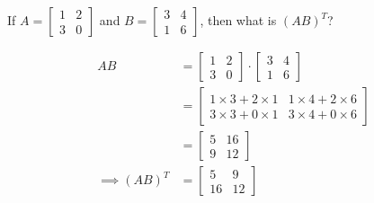

\question[2] If $A = \left[ \begin{array}{cc} 
1 & 2 \\ 
3 & 0
\end{array}\right]$ and 
$B = \left[ \begin{array}{cc}
3 & 4 \\
1 & 6
\end{array} \right]$, then what is $(AB)^{T}$?


\ifprintanswers
\fi 

\begin{solution}[\halfpage]
	\begin{align}
	   AB &= \left[ \begin{array}{cc} 1 & 2 \\ 3 & 0\end{array} \right]\cdot
	         \left[ \begin{array}{cc} 3 & 4 \\ 1 & 6 \end{array}\right] \\
	      &= \left[ 
	           \begin{array}{cc}
	              1\times 3 + 2\times 1 & 1\times 4 + 2 \times 6 \\
	              3\times 3 + 0\times 1 & 3\times 4 + 0\times 6 
	           \end{array}
	         \right] \\
	      &= \left[
	           \begin{array}{cc}
	               5 & 16 \\
	               9 & 12
	           \end{array}
	         \right] \\
	     \implies (AB)^{T} &= \left[
	                                \begin{array}{cc}
	                                   5 & 9 \\
	                                   16 & 12 
	                                \end{array}
	                             \right]
	\end{align}
\end{solution}
